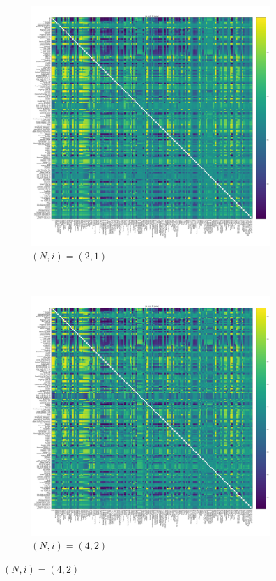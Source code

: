 \documentclass{article}
\begin{document}
\begin{figure}[!hbtp]
    \centering
    \begin{subfigure}[t]{.3\textwidth}
        \centering
        \includegraphics[width=.8\textwidth]{../img/fixation_heatmap_2_1_noise.pdf}
        \caption{\((N,i)=(2, 1)\)}
    \end{subfigure}%
    ~
    \begin{subfigure}[t]{.3\textwidth}
        \centering
        \includegraphics[width=.8\textwidth]{../img/fixation_heatmap_4_2_noise.pdf}
        \caption{\((N,i)=(4, 2)\)}
    \end{subfigure}%

\end{figure}
\end{document}
